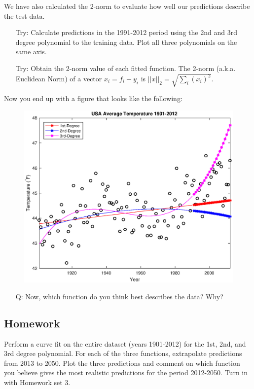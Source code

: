 \documentclass[12pt]{article}
\begin{document}
We have also calculated the 2-norm to evaluate how well our predictions describe the test data. 

\begin{enumerate}
\item[Try:] Calculate predictions in the 1991-2012 period using the 2nd and 3rd degree polynomial to the training data. Plot all three polynomials on the same axis. 
\item[Try:] Obtain the 2-norm value of each fitted function. The 2-norm (a.k.a. Euclidean Norm) of a vector $x_i = f_i-y_i$  is $||x||_2=\sqrt{\sum_i(x_i)^2}$. 
\end{enumerate}

Now you end up with a figure that looks like the following:

\begin{figure}[H]
\centering
\includegraphics[width=0.75\linewidth]{matlab/dataTemp/tempVsYearTest.eps}
\end{figure}

\begin{enumerate}
\item[Q:] Now, which function do you think best describes the data? Why?
\end{enumerate}

\subsection{Homework}
Perform a curve fit on the entire dataset (years 1901-2012) for the 1st, 2nd, and 3rd degree polynomial. For each of the three functions, extrapolate predictions from 2013 to 2050. Plot the three predictions and comment on which function you believe gives the most realistic predictions for the period 2012-2050. Turn in with Homework set 3. 
\end{document}
